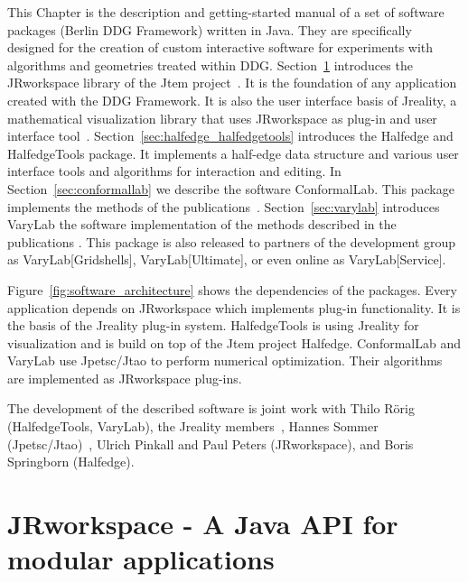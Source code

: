 This Chapter is the description and getting-started manual of a set of software packages
(Berlin DDG Framework) written in Java. They are specifically designed for the creation of
custom interactive software for experiments with algorithms and geometries treated 
within DDG. Section~\ref{sec:jrworkspace} introduces the {\sc JRworkspace} library of the 
{\sc Jtem} project~\cite{JtemWebsite}. It is the foundation of any application created with 
the DDG Framework. It is also the user interface basis of {\sc Jreality}, a mathematical 
visualization library that uses {\sc JRworkspace} as plug-in and user interface 
tool~\cite{JrealityWebsite}. Section~\ref{sec:halfedge_halfedgetools} introduces the 
{\sc Halfedge} and {\sc HalfedgeTools} package. It implements a half-edge data 
structure and various user interface tools and algorithms for interaction and editing.  
In Section~\ref{sec:conformallab} we describe the software 
{\sc ConformalLab}. This package implements the methods of the 
publications~\cite{Bobenko2010, OWR2012, Sechelmann2012, BobSechSpr}.
Section~\ref{sec:varylab} introduces {\sc VaryLab} the software implementation of the 
methods described in the publications \cite{Lafuente2011, Lafuente2012, Sechelmann2012}.
This package is also released to partners of the development group as 
{\sc VaryLab[Gridshells]}, {\sc VaryLab[Ultimate]}, or even online as {\sc VaryLab[Service]}.


Figure~\ref{fig:software_architecture} shows the dependencies of the packages. Every
application depends on {\sc JRworkspace} which implements plug-in functionality. It is
the basis of the {\sc Jreality} plug-in system. {\sc Half\-edge\-Tools} is using {\sc Jreality} 
for visualization and is build on top of the {\sc Jtem} project {\sc Half\-edge}. 
{\sc ConformalLab} and {\sc VaryLab} use {\sc Jpetsc/Jtao} to perform numerical
optimization. Their algorithms are implemented as {\sc JRworkspace} plug-ins.


The development of the described software is joint work with Thilo R{\" o}rig 
({\sc HalfedgeTools, VaryLab}), the {\sc Jreality} members~\cite{JrealityWebsite}, Hannes 
Sommer ({\sc Jpetsc/Jtao})~\cite{jpetsctao-web-page}, Ulrich Pinkall and Paul Peters ({\sc JRworkspace}), and 
Boris Springborn ({\sc Halfedge}).



\section{{\sc JRworkspace} - A Java API for modular applications}
\label{sec:jrworkspace}


